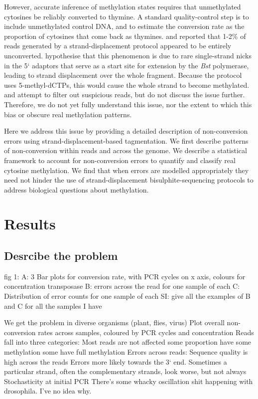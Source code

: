 \documentclass[12pt,longbibliography]{article}
\begin{document}
However, accurate inference of methylation states requires that unmethylated cytosines be reliably converted to thymine.
A standard quality-control step is to include unmethylated control DNA, and to estimate the conversion rate as the proportion of cytosines that come back as thymines.
\textcite{lu2015improved} and \textcite{suzuki2018whole} reported that 1-2\% of reads generated by a strand-displacement protocol appeared to be entirely unconverted.
\textcite{lu2015improved} hypothesise that this phenomenon is due to rare single-strand nicks in the 5` adaptors that serve as a start site for extension by the \textit{Bst} polymerase, leading to strand displacement over the whole fragment.
Because the protocol uses 5-methyl-dCTPs, this would cause the whole strand to become methylated.
\textcite{lu2015improved} and \textcite{suzuki2018whole} attempt to filter out suspicious reads, but do not discuss the issue further.
Therefore, we do not yet fully understand this issue, nor the extent to which this bias or obscure real methylation patterns.

Here we address this issue by providing a detailed description of non-conversion errors using strand-displacement-based tagmentation.
We first describe patterns of non-conversion within reads and across the genome.
We describe a statistical framework to account for non-conversion errors to quantify and classify real cytosine methylation.
We find that when errors are modelled appropriately they need not hinder the use of strand-displacement bisulphite-sequencing protocols to address biological questions about methylation.

\section{Results}

\subsection{Desrcibe the problem}

fig 1:
    A: 3 Bar plots for conversion rate, with PCR cycles on x axis, colours for concentration transposase
    B: errors across the read for one sample of each
    C: Distribution of error counts for one sample of each
    SI: give all the examples of B and C for all the samples I have

We get the problem in diverse organisms (plant, flies, virus)
    Plot overall non-conversion rates across samples, coloured by PCR cycles and concentration
Reads fall into three categories:
    Most reads are not affected
    some proportion have some methylation
    some have full methylation
Errors across reads:
    Sequence quality is high across the reads
    Errors more likely towards the 3` end.
    Sometimes a particular strand, often the complementary strands, look worse, but not always
        Stochasticity at initial PCR
    There's some whacky oscillation shit happening with drosophila. I've no idea why.
\end{document}
